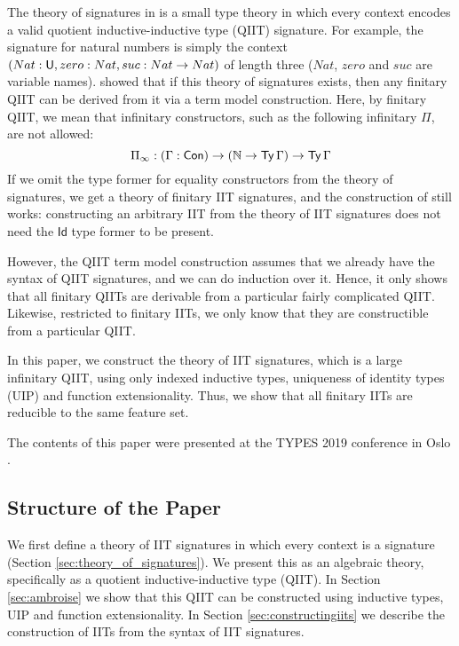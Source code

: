 \documentclass[a4paper,UKenglish,cleveref, autoref]{lipics-v2019}
\begin{document}
The theory of signatures in \cite{Kaposi:2019:CQI:3302515.3290315} is a small
type theory in which every context encodes a valid quotient inductive-inductive
type (QIIT) signature. For example, the signature for natural numbers is simply
the context $(Nat:\mathsf{U},zero:Nat,suc:Nat\rightarrow Nat)$ of length three ($Nat$, $zero$
and $suc$ are variable names). \cite{Kaposi:2019:CQI:3302515.3290315} showed
that if this theory of signatures exists, then any finitary QIIT can be derived
from it via a term model construction.
Here, by finitary QIIT, we mean that infinitary constructors, such as the following
infinitary $\Pi$, are not allowed:
\[
  \Pi_\infty : (\Gamma : \mathsf{Con}) \rightarrow (\mathbb{N} \rightarrow \mathsf{Ty}\,\Gamma) \rightarrow \mathsf{Ty}\,\Gamma
   \]
If we omit the type former for equality
constructors from the theory of signatures, we get a theory of finitary IIT
signatures, and the construction of \cite{Kaposi:2019:CQI:3302515.3290315} still
works: constructing an arbitrary IIT from the theory of IIT signatures does not
need the $\mathsf{Id}$ type former to be present.

However, the QIIT term model construction assumes that we already have the
syntax of QIIT signatures, and we can do induction over it. Hence, it only shows
that all finitary QIITs are derivable from a particular fairly complicated QIIT.
Likewise, restricted to finitary IITs, we only know that they are constructible
from a particular QIIT.

In this paper, we construct the theory of IIT signatures, which is a large
infinitary QIIT, using only indexed inductive types, uniqueness of identity
types (UIP) and function extensionality. Thus, we show that all finitary IITs are
reducible to the same feature set.

The contents of this paper were presented at the TYPES 2019 conference
in Oslo \cite{types}.

\subsection{Structure of the Paper}

We first define a theory of IIT signatures in which every context is a signature
(Section \ref{sec:theory_of_signatures}). We present this as an algebraic
\cite{ttintt} theory, specifically as a quotient inductive-inductive type
(QIIT). In Section \ref{sec:ambroise} we show that this QIIT can be constructed
using inductive types, UIP and function extensionality. In Section
\ref{sec:constructingiits} we describe the construction of IITs from the syntax
of IIT signatures.
\end{document}

